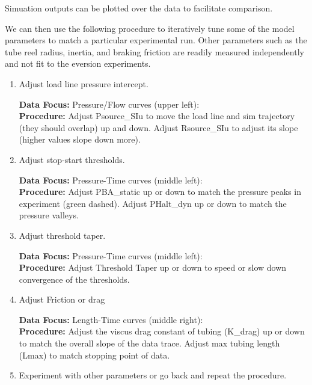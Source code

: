 \documentclass[letterpaper]{article}
\begin{document}

Simuation outputs can be plotted over the data to facilitate comparison.

We can then use the following procedure to iteratively tune some of the  model  parameters to match a
particular experimental run.   Other parameters such as the tube reel radius, inertia, and braking
friction are readily measured independently \cite{Andy Papers}  and not fit to the eversion experiments.

\begin{enumerate}
    \item  Adjust load line pressure intercept.

    {\bf Data Focus: } Pressure/Flow curves (upper left):\\
    {\bf Procedure: } Adjust Psource\_SIu to move the load line and sim trajectory (they should overlap)
    up and down.  Adjust Rsource\_SIu to adjust its slope (higher values slope down more).

    \item Adjust stop-start thresholds.

     {\bf Data Focus: } Pressure-Time curves (middle left):\\
    {\bf Procedure: } Adjust PBA\_static up or down to match the pressure peaks in experiment (green dashed).
    Adjust PHalt\_dyn  up or down to match the pressure valleys.

    \item Adjust threshold taper.

     {\bf Data Focus: } Pressure-Time curves (middle left):\\
    {\bf Procedure: } Adjust Threshold Taper up or down to speed or slow down convergence of the thresholds.

    \item Adjust Friction or drag

     {\bf Data Focus: } Length-Time curves (middle right):\\
    {\bf Procedure: } Adjust the viscus drag constant of tubing (K\_drag) up or down to match the overall slope
    of the data trace.
    Adjust max tubing length (Lmax) to match stopping point of data.

    \item Experiment with other parameters or go back and repeat the procedure.

\end{enumerate}
\end{document}
